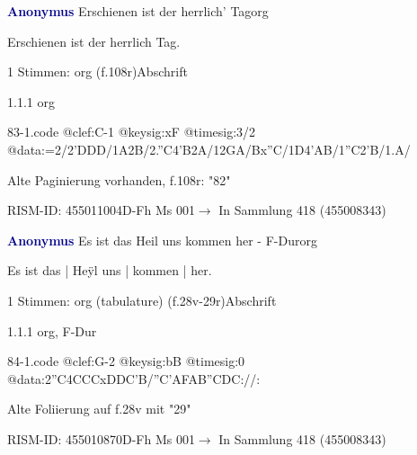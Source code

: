 \documentclass[twocolumn, 12pt]{book}
\begin{document}
\par \vspace{16pt} \textcolor{darkblue}{\textbf{Anonymus  }}\hfillplus{\textbf{[83]}}\newline Erschienen ist der herrlich' Tag\newline org
\par \begin{itshape}[f.108r, heading:] Erschienen ist der herrlich Tag.\end{itshape} 
\par \textcolor{darkblue}{}  1 Stimmen: org  (f.108r)\newline Abschrift
\par 1.1.1  org  
\begin{filecontents*}{83-1.code}
@clef:C-1
@keysig:xF
@timesig:3/2
@data:=2/2'DDD/1A2B/2.''C4'B2A/12GA/Bx''C/1D4'AB/1''C2'B/1.A/
\end{filecontents*}
\newline %
\par Alte Paginierung vorhanden, f.108r: "82"
\par RISM-ID: 455011004\newline D-Fh  Ms 001\newline $\rightarrow$ In Sammlung 418 (455008343)
      
\par \vspace{16pt} \textcolor{darkblue}{\textbf{Anonymus  }}\hfillplus{\textbf{[84]}}\newline Es ist das Heil uns kommen her - F-Dur\newline org
\par \begin{itshape}[f.28v, at left:] Es ist das | Heÿl uns | kommen | her.\end{itshape} 
\par \textcolor{darkblue}{}  1 Stimmen: org (tabulature)  (f.28v-29r)\newline Abschrift
\par 1.1.1  org, F-Dur  
\begin{filecontents*}{84-1.code}
@clef:G-2
@keysig:bB
@timesig:0
@data:2''C4CCCxDDC'B/''C'AFAB''CDC://:
\end{filecontents*}
\newline %
\par Alte Foliierung auf f.28v mit "29"
\par RISM-ID: 455010870\newline D-Fh  Ms 001\newline $\rightarrow$ In Sammlung 418 (455008343)
      
\end{document}
